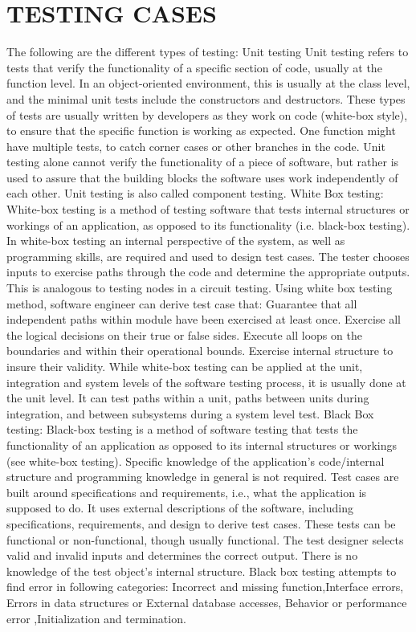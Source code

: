 \section{TESTING CASES}
        The following are the different types of testing:
Unit testing
        Unit testing refers to tests that verify the functionality of a specific section of code, usually at the function level. In an object-oriented environment, this is usually at the class level, and the minimal unit tests include the constructors and destructors.
       These types of tests are usually written by developers as they work on code (white-box style), to ensure that the specific function is working as expected. One function might have multiple tests, to catch corner cases or other branches in the code. Unit testing alone cannot verify the functionality of a piece of software, but rather is used to assure that the building blocks the software uses work independently of each other. Unit testing is also called component testing.
White Box testing:
         White-box testing is a method of testing software that tests internal structures or workings of an application, as opposed to its functionality (i.e. black-box testing). In white-box testing an internal perspective of the system, as well as programming skills, are required and used to design test cases. The tester chooses inputs to exercise paths through the code and determine the appropriate outputs. This is analogous to testing nodes in a circuit testing. Using white box testing method, software engineer can derive test case that:
Guarantee that all independent paths within module have been exercised at least once.
Exercise all the logical decisions on their true or false sides.
Execute all loops on the boundaries and within their operational bounds.
Exercise internal structure to insure their validity.
While white-box testing can be applied at the unit, integration and system levels of the software testing process, it is usually done at the unit level. It can test paths within a unit, paths between units during integration, and between subsystems during a system level test. 
Black Box testing:
		Black-box testing is a method of software testing that tests the functionality of an application as opposed to its internal structures or workings (see white-box testing). Specific knowledge of the application's code/internal structure and programming knowledge in general is not required. Test cases are built around specifications and requirements, i.e., what the application is supposed to do. It uses external descriptions of the software, including specifications, requirements, and design to derive test cases. These tests can be functional or non-functional, though usually functional. The test designer selects valid and invalid inputs and determines the correct output. There is no knowledge of the test object's internal structure. Black box testing attempts to find error in following categories:
Incorrect and missing function,Interface errors, Errors in data structures or External database accesses, Behavior or performance error ,Initialization  and termination.\\

